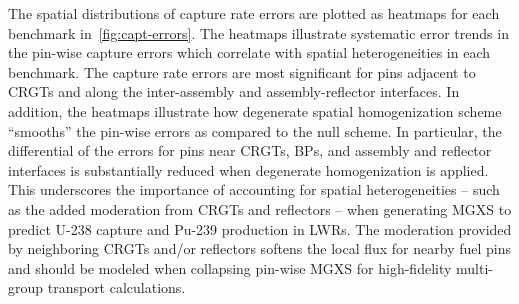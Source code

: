 The spatial distributions of capture rate errors are plotted as heatmaps for each benchmark in~\autoref{fig:capt-errors}. The heatmaps illustrate systematic error trends in the pin-wise capture errors which correlate with spatial heterogeneities in each benchmark. The capture rate errors are most significant for pins adjacent to CRGTs and along the inter-assembly and assembly-reflector interfaces. In addition, the heatmaps illustrate how degenerate spatial homogenization scheme ``smooths'' the pin-wise errors as compared to the null scheme. In particular, the differential of the errors for pins near CRGTs, BPs, and assembly and reflector interfaces is substantially reduced when degenerate homogenization is applied. This underscores the importance of accounting for spatial heterogeneities -- such as the added moderation from CRGTs and reflectors -- when generating MGXS to predict U-238 capture and Pu-239 production in LWRs. The moderation provided by neighboring CRGTs and/or reflectors softens the local flux for nearby fuel pins and should be modeled when collapsing pin-wise MGXS for high-fidelity multi-group transport calculations. 

